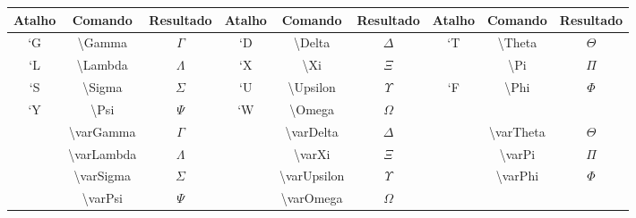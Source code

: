 % 
% 
% 
% 
% 
\begin{tabular}{ccc|ccc|ccc}
    \hline
    Atalho & Comando & Resultado & Atalho & Comando & Resultado & Atalho & Comando & Resultado \\ \hline
    `\textsf{G} & \textbackslash\textsf{Gamma} & $\Gamma$ & `\textsf{D} & \textbackslash\textsf{Delta} & $\Delta$ & `\textsf{T} & \textbackslash\textsf{Theta} & $\Theta$ \\
    `\textsf{L} & \textbackslash\textsf{Lambda} & $\Lambda$ & `\textsf{X} & \textbackslash\textsf{Xi} & $\Xi$ & & \textbackslash\textsf{Pi} & $\Pi$ \\
    `\textsf{S} & \textbackslash\textsf{Sigma} & $\Sigma$ & `\textsf{U} & \textbackslash\textsf{Upsilon} & $\Upsilon$ & `\textsf{F} & \textbackslash\textsf{Phi} & $\Phi$ \\
    `\textsf{Y} & \textbackslash\textsf{Psi} & $\Psi$ & `\textsf{W} & \textbackslash\textsf{Omega} & $\Omega$ \\
    & \textbackslash\textsf{varGamma} & $\varGamma$ & & \textbackslash\textsf{varDelta} & $\varDelta$ & & \textbackslash\textsf{varTheta} & $\varTheta$ \\
    & \textbackslash\textsf{varLambda} & $\varLambda$ & & \textbackslash\textsf{varXi} & $\varXi$ & & \textbackslash\textsf{varPi} & $\varPi$ \\
    & \textbackslash\textsf{varSigma} & $\varSigma$ & & \textbackslash\textsf{varUpsilon} & $\varUpsilon$ & & \textbackslash\textsf{varPhi} & $\varPhi$ \\
    & \textbackslash\textsf{varPsi} & $\varPsi$ & & \textbackslash\textsf{varOmega} & $\varOmega$ & & \\ \hline
\end{tabular}

